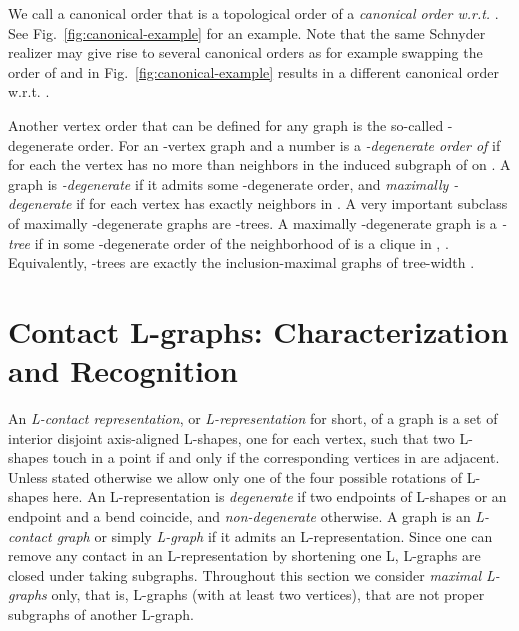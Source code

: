 \documentclass{llncs}
\begin{document}
We call a canonical order that is a topological order of  a \emph{canonical order w.r.t. }. See Fig.~\ref{fig:canonical-example} for an example. Note that the same Schnyder realizer may give rise to several canonical orders as for example swapping the order of  and  in Fig.~\ref{fig:canonical-example} results in a different canonical order w.r.t. .

\medskip

Another vertex order that can be defined for any graph is the so-called -degenerate order. For an -vertex graph  and a number   is a \emph{-degenerate order of } if for each  the vertex  has no more than  neighbors in the induced subgraph  of  on . A graph is \emph{-degenerate} if it admits some -degenerate order, and \emph{maximally -degenerate} if for each  vertex  has exactly  neighbors in . A very important subclass of maximally -degenerate graphs are -trees. A maximally -degenerate graph  is a \emph{-tree} if in some -degenerate order of  the neighborhood of  is a clique in , . Equivalently, -trees are exactly the inclusion-maximal graphs of tree-width .



\section{Contact L-graphs: Characterization and Recognition}\label{sec:characterization}

An \emph{L-contact representation}, or \emph{L-representation} for short, of a graph  is a set of interior disjoint axis-aligned L-shapes, one for each vertex, such that two L-shapes touch in a point if and only if the corresponding vertices in  are adjacent. Unless stated otherwise we allow only one of the four possible rotations of L-shapes here. An L-representation is \emph{degenerate} if two endpoints of L-shapes or an endpoint and a bend coincide, and \emph{non-degenerate} otherwise. A graph is an \emph{L-contact graph} or simply \emph{L-graph} if it admits an L-representation. Since one can remove any contact in an L-representation by shortening one L, L-graphs are closed under taking subgraphs. Throughout this section we consider \emph{maximal L-graphs} only, that is, L-graphs (with at least two vertices), that are not proper subgraphs of another L-graph.
\end{document}
